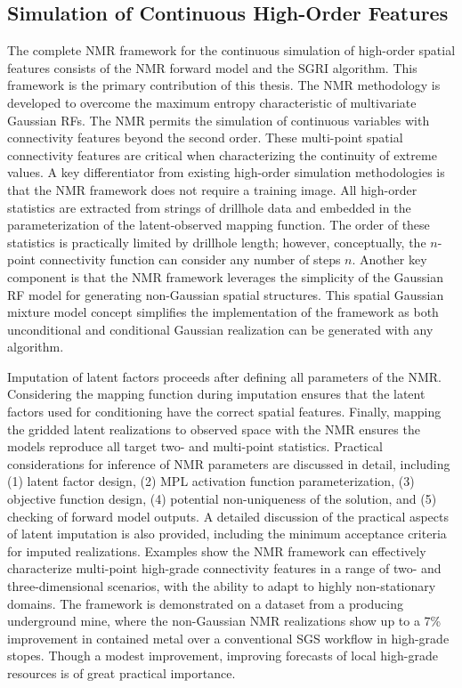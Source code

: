 \subsection{Simulation of Continuous High-Order Features}
\label{subsec:07hosim}

The complete \gls{NMR} framework for the continuous simulation of high-order spatial features consists of the \gls{NMR} forward model and the \gls{SGRI} algorithm. This framework is the primary contribution of this thesis. The \gls{NMR} methodology is developed to overcome the maximum entropy characteristic of multivariate Gaussian \glspl{RF}. The \gls{NMR} permits the simulation of continuous variables with connectivity features beyond the second order. These multi-point spatial connectivity features are critical when characterizing the continuity of extreme values. A key differentiator from existing high-order simulation methodologies \citep{mustapha2011hosim} is that the \gls{NMR} framework does not require a training image. All high-order statistics are extracted from strings of drillhole data and embedded in the parameterization of the latent-observed mapping function. The order of these statistics is practically limited by drillhole length; however, conceptually, the $n$-point connectivity function can consider any number of steps $n$. Another key component is that the \gls{NMR} framework leverages the simplicity of the Gaussian \gls{RF} model for generating non-Gaussian spatial structures. This spatial Gaussian mixture model concept simplifies the implementation of the framework as both unconditional and conditional Gaussian realization can be generated with any algorithm.

Imputation of latent factors proceeds after defining all parameters of the \gls{NMR}. Considering the mapping function during imputation ensures that the latent factors used for conditioning have the correct spatial features. Finally, mapping the gridded latent realizations to observed space with the \gls{NMR} ensures the models reproduce all target two- and multi-point statistics. Practical considerations for inference of \gls{NMR} parameters are discussed in detail, including (1) latent factor design, (2) \gls{MPL} activation function parameterization, (3) objective function design, (4) potential non-uniqueness of the solution, and (5) checking of forward model outputs. A detailed discussion of the practical aspects of latent imputation is also provided, including the minimum acceptance criteria for imputed realizations. Examples show the \gls{NMR} framework can effectively characterize multi-point high-grade connectivity features in a range of two- and three-dimensional scenarios, with the ability to adapt to highly non-stationary domains. The framework is demonstrated on a dataset from a producing underground mine, where the non-Gaussian \gls{NMR} realizations show up to a 7\% improvement in contained metal over a conventional \gls{SGS} workflow in high-grade stopes. Though a modest improvement, improving forecasts of local high-grade resources is of great practical importance.

